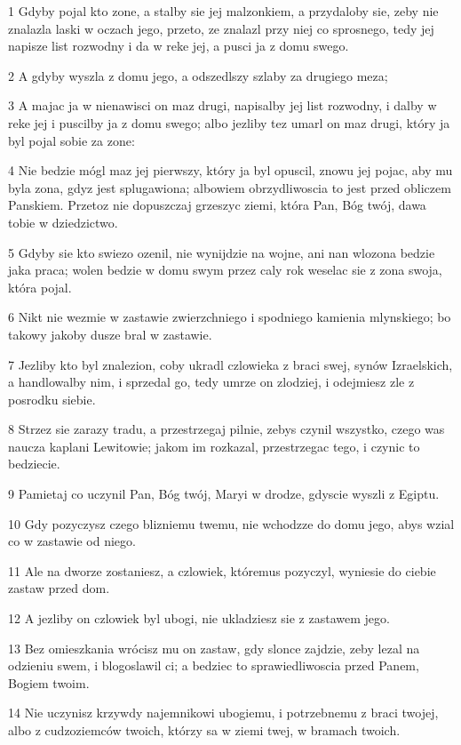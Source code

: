 \par 1 Gdyby pojal kto zone, a stalby sie jej malzonkiem, a przydaloby sie, zeby nie znalazla laski w oczach jego, przeto, ze znalazl przy niej co sprosnego, tedy jej napisze list rozwodny i da w reke jej, a pusci ja z domu swego.
\par 2 A gdyby wyszla z domu jego, a odszedlszy szlaby za drugiego meza;
\par 3 A majac ja w nienawisci on maz drugi, napisalby jej list rozwodny, i dalby w reke jej i puscilby ja z domu swego; albo jezliby tez umarl on maz drugi, który ja byl pojal sobie za zone:
\par 4 Nie bedzie mógl maz jej pierwszy, który ja byl opuscil, znowu jej pojac, aby mu byla zona, gdyz jest splugawiona; albowiem obrzydliwoscia to jest przed obliczem Panskiem. Przetoz nie dopuszczaj grzeszyc ziemi, która Pan, Bóg twój, dawa tobie w dziedzictwo.
\par 5 Gdyby sie kto swiezo ozenil, nie wynijdzie na wojne, ani nan wlozona bedzie jaka praca; wolen bedzie w domu swym przez caly rok weselac sie z zona swoja, która pojal.
\par 6 Nikt nie wezmie w zastawie zwierzchniego i spodniego kamienia mlynskiego; bo takowy jakoby dusze bral w zastawie.
\par 7 Jezliby kto byl znalezion, coby ukradl czlowieka z braci swej, synów Izraelskich, a handlowalby nim, i sprzedal go, tedy umrze on zlodziej, i odejmiesz zle z posrodku siebie.
\par 8 Strzez sie zarazy tradu, a przestrzegaj pilnie, zebys czynil wszystko, czego was naucza kaplani Lewitowie; jakom im rozkazal, przestrzegac tego, i czynic to bedziecie.
\par 9 Pamietaj co uczynil Pan, Bóg twój, Maryi w drodze, gdyscie wyszli z Egiptu.
\par 10 Gdy pozyczysz czego blizniemu twemu, nie wchodzze do domu jego, abys wzial co w zastawie od niego.
\par 11 Ale na dworze zostaniesz, a czlowiek, któremus pozyczyl, wyniesie do ciebie zastaw przed dom.
\par 12 A jezliby on czlowiek byl ubogi, nie ukladziesz sie z zastawem jego.
\par 13 Bez omieszkania wrócisz mu on zastaw, gdy slonce zajdzie, zeby lezal na odzieniu swem, i blogoslawil ci; a bedziec to sprawiedliwoscia przed Panem, Bogiem twoim.
\par 14 Nie uczynisz krzywdy najemnikowi ubogiemu, i potrzebnemu z braci twojej, albo z cudzoziemców twoich, którzy sa w ziemi twej, w bramach twoich.
